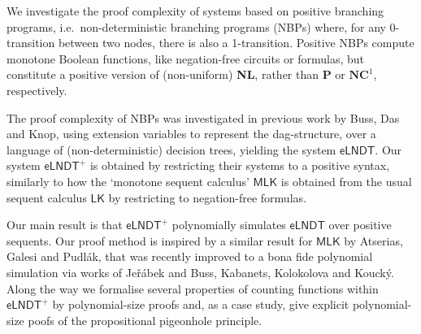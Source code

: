 \documentclass[bsl,meeting]{asl}
\newcommand{\NP}{}
\begin{document}
\thispagestyle{empty}




\NP  
{}




    We investigate the proof complexity of systems based on positive branching programs, 
i.e.\ non-deterministic branching programs (NBPs) where, for any 0-transition between two nodes, there is also a  1-transition. 
Positive NBPs compute monotone Boolean functions, like negation-free circuits or formulas, but constitute a positive version of (non-uniform) \textbf{NL}, rather than \textbf{P} or $\textbf{NC}^1$, respectively.

The proof complexity of NBPs was investigated in previous work by Buss, Das and Knop, using extension variables to represent the dag-structure, over a language of (non-deterministic) decision trees, yielding the system $\mathsf{eLNDT}$.
Our system $\mathsf{eLNDT}^+$ is obtained by restricting their systems to a positive syntax, similarly to how the `monotone sequent calculus' $\mathsf{MLK}$ is obtained from the usual sequent calculus $\mathsf{LK}$ by restricting to negation-free formulas.

Our main result is that $\mathsf{eLNDT}^+$ polynomially simulates  $\mathsf{eLNDT}$ over positive sequents. Our proof method is inspired by a similar result for $\mathsf{MLK}$ by Atserias, Galesi and Pudl\'ak, that was recently improved to a bona fide polynomial simulation via works 
of Je\v r\'abek and Buss, Kabanets, Kolokolova and Kouck\'y.
Along the way we formalise several properties of counting functions within $\mathsf{eLNDT}^+$ by polynomial-size proofs and, as a case study, give explicit polynomial-size poofs of the propositional pigeonhole principle.








\vspace*{-0.5\baselineskip}
\end{document}
